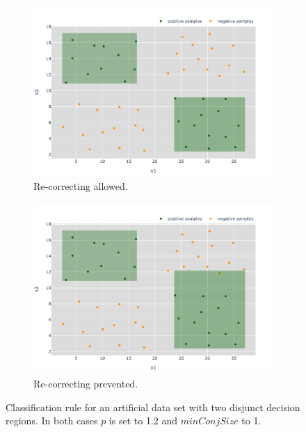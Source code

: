 \begin{figure}
    \centering
    \begin{subfigure}{\textwidth}
        \centering
        \includegraphics[width=0.85\columnwidth]{figures/two_reg_recorrecting.pdf}
        \caption{Re-correcting allowed.}\label{fig:withRecorr}
    \end{subfigure}
    \hfill
    \begin{subfigure}{\textwidth}
        \centering
        \includegraphics[width=0.85\columnwidth]{figures/two_reg_no_recorrecting.pdf}
        \caption{Re-correcting prevented.}\label{fig:noRecorr}
    \end{subfigure}
    \caption{Classification rule for an artificial data set with two disjunct decision regions.
        In both cases \(p\) is set to 1.2 and \(minConjSize\) to 1.}\label{fig:recorr}
\end{figure}


